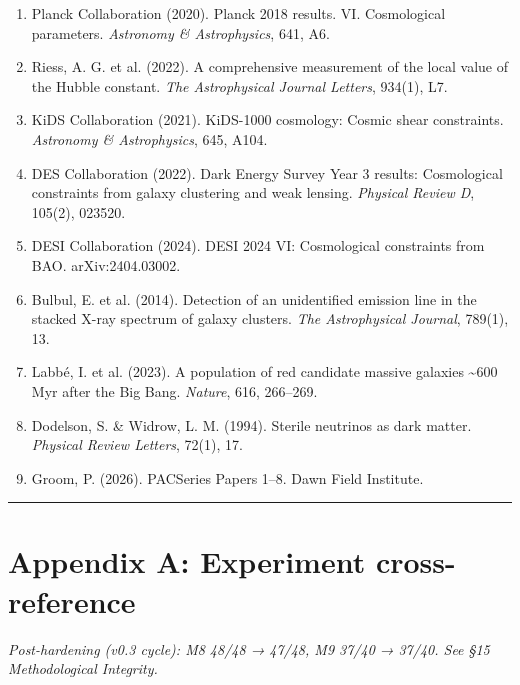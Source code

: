\documentclass[11pt,a4paper]{article}
\providecommand{\tightlist}{\setlength{\itemsep}{0pt}\setlength{\parskip}{0pt}}
\begin{document}
\begin{enumerate}\tightlist
\item Planck Collaboration (2020). Planck 2018 results. VI. Cosmological parameters. \emph{Astronomy \& Astrophysics}, 641, A6.
\item Riess, A. G. et al. (2022). A comprehensive measurement of the local value of the Hubble constant. \emph{The Astrophysical Journal Letters}, 934(1), L7.
\item KiDS Collaboration (2021). KiDS-1000 cosmology: Cosmic shear constraints. \emph{Astronomy \& Astrophysics}, 645, A104.
\item DES Collaboration (2022). Dark Energy Survey Year 3 results: Cosmological constraints from galaxy clustering and weak lensing. \emph{Physical Review D}, 105(2), 023520.
\item DESI Collaboration (2024). DESI 2024 VI: Cosmological constraints from BAO. arXiv:2404.03002.
\item Bulbul, E. et al. (2014). Detection of an unidentified emission line in the stacked X-ray spectrum of galaxy clusters. \emph{The Astrophysical Journal}, 789(1), 13.
\item Labbé, I. et al. (2023). A population of red candidate massive galaxies \textasciitilde{}600 Myr after the Big Bang. \emph{Nature}, 616, 266–269.
\item Dodelson, S. \& Widrow, L. M. (1994). Sterile neutrinos as dark matter. \emph{Physical Review Letters}, 72(1), 17.
\item Groom, P. (2026). PACSeries Papers 1–8. Dawn Field Institute.
\end{enumerate}

\begin{center}\rule{0.5\linewidth}{0.4pt}\end{center}

\section*{Appendix A: Experiment cross-reference}

\emph{Post-hardening (v0.3 cycle): M8 48/48 → 47/48, M9 37/40 → 37/40. See §15 Methodological Integrity.}
\end{document}
